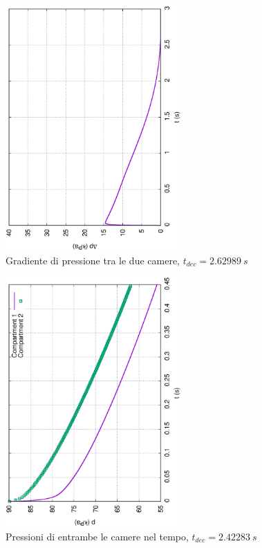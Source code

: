 \documentclass{article}
\begin{document}
        \begin{figure}[h!]
            \centering
            \label{fig:grad_cam_0.5}
            \includegraphics[width=0.6\textwidth, angle=-90]{MUL2/Esercitazione1/1B/Dp.eps}
            \caption{Gradiente di pressione tra le due camere, $t_{dec} = 2.62989 \ s$}
        \end{figure}
        \clearpage

        \begin{figure}[h!]
            \centering
            \label{fig:press_cam_1}
            \includegraphics[width=0.6\textwidth, angle=-90]{MUL2/Esercitazione1/1C/p.eps}
            \caption{Pressioni di entrambe le camere nel tempo, $t_{dec} = 2.42283 \ s$}
        \end{figure}
\end{document}
